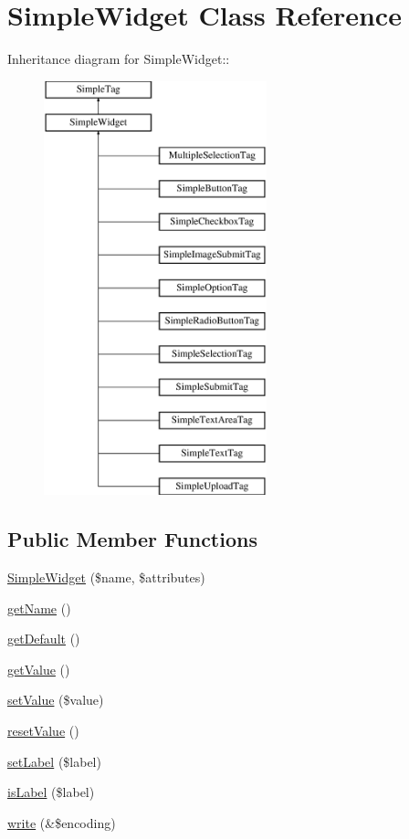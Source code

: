 \hypertarget{class_simple_widget}{
\section{SimpleWidget Class Reference}
\label{class_simple_widget}
}
Inheritance diagram for SimpleWidget::\begin{figure}[H]
\begin{center}
\leavevmode
\includegraphics[height=12cm]{class_simple_widget}
\end{center}
\end{figure}
\subsection*{Public Member Functions}
\begin{DoxyCompactItemize}
\item 
\hyperlink{class_simple_widget_a76a5c48eb5110ad5bb13f683ea4c77bf}{SimpleWidget} (\$name, \$attributes)
\item 
\hyperlink{class_simple_widget_a843805d75f3035c202d169b343005828}{getName} ()
\item 
\hyperlink{class_simple_widget_a9c0702cdfee1237b1599cb920ce14ba6}{getDefault} ()
\item 
\hyperlink{class_simple_widget_a92328cffb96f6966d6a6a07827e65f6d}{getValue} ()
\item 
\hyperlink{class_simple_widget_a9e048a450e2d29a601e672deda9fa869}{setValue} (\$value)
\item 
\hyperlink{class_simple_widget_a30843333201512c78950addd7589516a}{resetValue} ()
\item 
\hyperlink{class_simple_widget_a8e03ad451a0a611ae3d94afcdb67a724}{setLabel} (\$label)
\item 
\hyperlink{class_simple_widget_ab4560f7a1b68df77c3ee34f6bc81dcab}{isLabel} (\$label)
\item 
\hyperlink{class_simple_widget_a5e546ea2ab317409554f80ba2313f7f2}{write} (\&\$encoding)
\end{DoxyCompactItemize}
